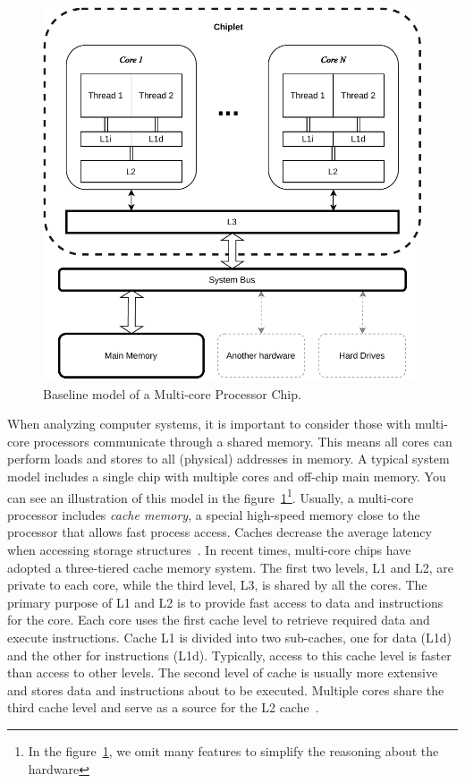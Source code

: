 \begin{figure}[ht!]
    \centering
    \includegraphics[width=0.7\linewidth]{contents//figures/III_2_cpu.pdf}
    \caption{Baseline model of a Multi-core Processor Chip.}
    \label{fig:multi-core-processor}
\end{figure}

When analyzing computer systems, it is important to consider those with multi-core processors communicate through a shared memory. This means all cores can perform loads and stores to all (physical) addresses in memory. A typical system model includes a single chip with multiple cores and off-chip main memory. You can see an illustration of this model in the figure~\ref{fig:multi-core-processor}\footnote{In the figure~\ref{fig:multi-core-processor}, we omit many features to simplify the reasoning about the hardware}. Usually, a multi-core processor includes \emph{cache memory}, a special high-speed memory close to the processor that allows fast process access. Caches decrease the average latency when accessing storage structures~\cite{DBLP_series_synthesis_2020Nagarajan, DBLP_series_synthesis_2013Scott}. In recent times, multi-core chips have adopted a three-tiered cache memory system. The first two levels, L1 and L2, are private to each core, while the third level, L3, is shared by all the cores. The primary purpose of L1 and L2 is to provide fast access to data and instructions for the core. Each core uses the first cache level to retrieve required data and execute instructions. Cache L1 is divided into two sub-caches, one for data (L1d) and the other for instructions (L1d). Typically, access to this cache level is faster than access to other levels. The second level of cache is usually more extensive and stores data and instructions about to be executed.
Multiple cores share the third cache level and serve as a source for the L2 cache~\cite{devices_amd64,guideintel}.


